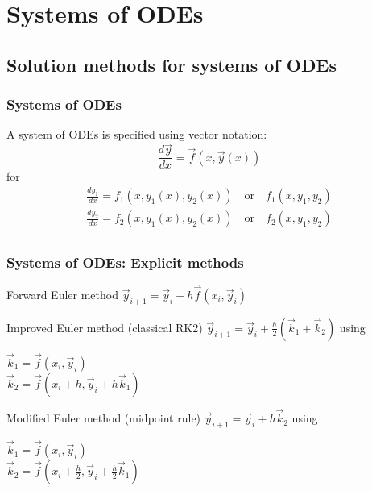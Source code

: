 \documentclass[11pt,table,final,fleqn,xcolor={usenames,dvipsnames,table}]{beamer}
\begin{document}
\section{Systems of ODEs}
\subsection{Solution methods for systems of ODEs}
\begin{frame}
  \frametitle{Systems of ODEs}
  A system of ODEs is specified using vector notation:
  \[
    \frac{d\vec{y}}{dx} = \vec{f}(x,\vec{y}(x))
  \]
  for
  \begin{multline*}
    \frac{dy_1}{dx} = f_1(x,y_1(x),y_2(x)) \quad \text{or} \quad f_1(x,y_1,y_2)\\
    \frac{dy_2}{dx} = f_2(x,y_1(x),y_2(x)) \quad \text{or} \quad f_2(x,y_1,y_2)\\
  \end{multline*}
  \pause
\end{frame}

\begin{frame}
  \frametitle{Systems of ODEs: Explicit methods}
  \begin{block}{Forward Euler method}
    $ \displaystyle  \vec{y}_{i+1} = \vec{y}_i + h \vec{f}(x_i,\vec{y}_i) $
  \end{block}
  \begin{block}{Improved Euler method (classical RK2)}
    $\displaystyle \vec{y}_{i+1} = \vec{y}_i + \frac{h}{2}(\vec{k}_1+\vec{k}_2)$
    \quad using \quad \begin{minipage}{0.4\textwidth}
      $\displaystyle \vec{k}_1 = \vec{f}(x_i,\vec{y}_i)$\\
      $\displaystyle \vec{k}_2 = \vec{f}(x_i+h,\vec{y}_i+h\vec{k}_1)$
    \end{minipage}
  \end{block}  
  \begin{block}{Modified Euler method (midpoint rule)}
    $\displaystyle \vec{y}_{i+1} = \vec{y}_i + h\vec{k}_2$
    \quad using \quad \begin{minipage}{0.4\textwidth}
      $\displaystyle \vec{k}_1 = \vec{f}(x_i,\vec{y}_i)$\\
      $\displaystyle \vec{k}_2 = \vec{f}(x_i+\frac{h}{2},\vec{y}_i+\frac{h}{2}\vec{k}_1)$
    \end{minipage}
  \end{block}   
\end{frame}
\end{document}
